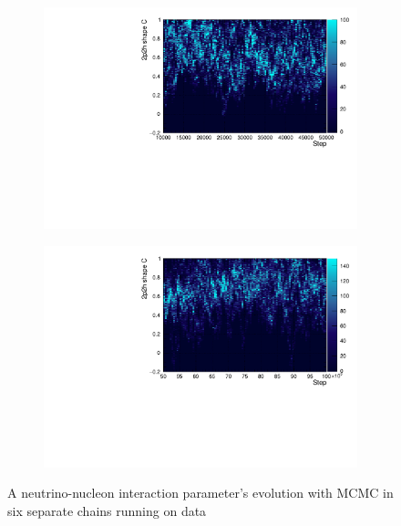 \begin{figure}[h]
	\begin{subfigure}[t]{0.40\textwidth}
		\includegraphics[width=\textwidth, trim={0mm 0mm 0mm 0mm}, clip,page=1]{figures/mcmc/2p2h_shape_C_step3}
	\end{subfigure}
	\begin{subfigure}[t]{0.40\textwidth}
		\includegraphics[width=\textwidth, trim={0mm 0mm 0mm 0mm}, clip,page=1]{figures/mcmc/2p2h_shape_C_step4}
	\end{subfigure}
	\caption{A neutrino-nucleon interaction parameter's evolution with MCMC in six separate chains running on data}
	\label{fig:2p2h_shape_mcmc}
\end{figure}

